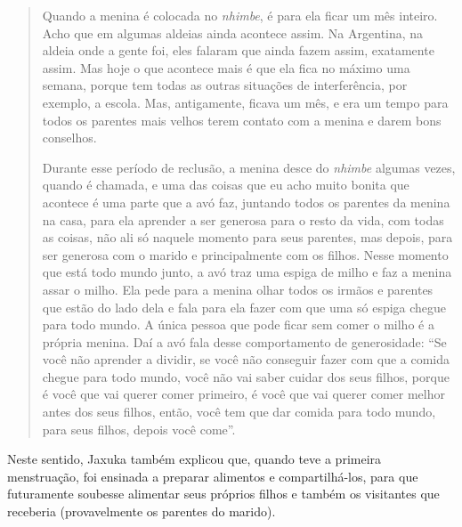 \begin{quotation}
\noindent
Quando a menina é colocada no \emph{nhimbe}, é para ela ficar um mês inteiro.
Acho que em algumas aldeias ainda acontece assim. Na Argentina, na
aldeia onde a gente foi, eles falaram que ainda fazem assim, exatamente
assim. Mas hoje o que acontece mais é que ela fica no máximo uma
semana, porque tem todas as outras situações de interferência, por
exemplo, a escola. Mas, antigamente, ficava um mês, e era um tempo para
todos os parentes mais velhos terem contato com a menina e darem bons
conselhos. 

\noindent
Durante esse período de reclusão, a menina desce do \emph{nhimbe} algumas
vezes, quando é chamada, e uma das coisas que eu acho muito bonita que
acontece é uma parte que a avó faz, juntando todos os parentes da
menina na casa, para ela aprender a ser generosa para o resto da vida,
com todas as coisas, não ali só naquele momento para seus parentes, mas
depois, para ser generosa com o marido e principalmente com os filhos.
Nesse momento que está todo mundo junto, a avó traz uma espiga de milho
e faz a menina assar o milho. Ela pede para a menina olhar todos os
irmãos e parentes que estão do lado dela e fala para ela fazer com que
uma só espiga chegue para todo mundo. A única pessoa que pode ficar sem
comer o milho é a própria menina. Daí a avó fala desse comportamento de
generosidade: ``Se você não aprender a dividir, se você não conseguir
fazer com que a comida chegue para todo mundo, você não vai saber
cuidar dos seus filhos, porque é você que vai querer comer primeiro, é
você que vai querer comer melhor antes dos seus filhos, então, você tem
que dar comida para todo mundo, para seus filhos, depois você come''. 

\end{quotation}
Neste sentido, Jaxuka também explicou que, quando teve a primeira
menstruação, foi ensinada a preparar alimentos e compartilhá-los, para
que futuramente soubesse alimentar seus próprios filhos e também os
visitantes que receberia (provavelmente os parentes do marido).

\bigskip

